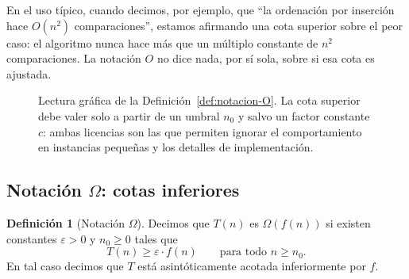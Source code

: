 \documentclass[12pt, spanish, oneside, openany]{book}
\theoremstyle{uprightplain}
\theoremstyle{definition}
\newtheorem{definicion}[teorema]{Definición}
\theoremstyle{remark}
\theoremstyle{definition}
\begin{document}
En el uso típico, cuando decimos, por ejemplo, que ``la ordenación por inserción hace $O(n^2)$ comparaciones'', estamos afirmando una cota superior sobre el peor caso: el algoritmo nunca hace más que un múltiplo constante de $n^2$ comparaciones. La notación $O$ no dice nada, por sí sola, sobre si esa cota es ajustada.
\begin{figure}[H]
\centering
{}
\caption{Lectura gráfica de la Definición~\ref{def:notacion-O}. La cota
superior debe valer solo a partir de un umbral $n_0$ y salvo un factor
constante $c$: ambas licencias son las que permiten ignorar el comportamiento
en instancias pequeñas y los detalles de implementación.}
\label{fig:notacion-O}
\end{figure}

\subsection{Notación $\Omega$: cotas inferiores}

\begin{definicion}[Notación $\Omega$]
\label{def:notacion-Omega}
Decimos que $T(n)$ es $\Omega(f(n))$ si existen constantes $\varepsilon>0$ y $n_0\ge 0$ tales que
\[
T(n) \ge \varepsilon\cdot f(n) \qquad \text{para todo } n\ge n_0.
\]
En tal caso decimos que $T$ está asintóticamente acotada inferiormente por $f$.
\end{definicion}
\end{document}
